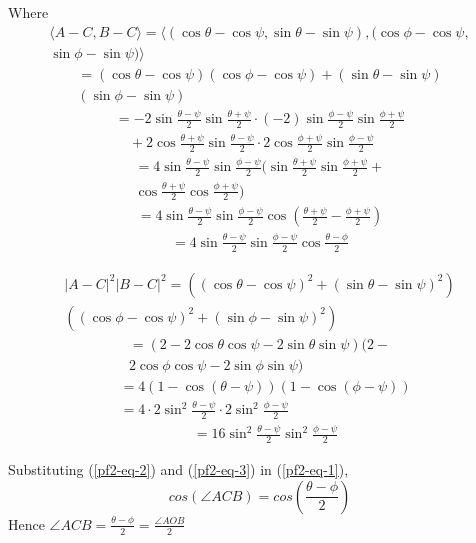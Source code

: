 \documentclass[journal,10pt,twocolumn]{article}
\begin{document}
Where
\begin{multline*}
	\langle A-C, B-C\rangle = \langle (\cos\theta-\cos\psi,\sin\theta-\sin\psi),(\cos\phi-\cos\psi,\\
	\sin\phi-\sin\psi)\rangle
	\end{multline*}
\begin{multline*}
	= (\cos\theta-\cos\psi)(\cos\phi-\cos\psi)+(\sin\theta-\sin\psi)\\
	(\sin\phi-\sin\psi)
\end{multline*}
\begin{multline*}
	= -2\sin\frac{\theta-\psi}2\sin\frac{\theta+\psi}2 \cdot(-2)\sin\frac{\phi-\psi}2\sin\frac{\phi+\psi}2 \\\quad+ 2\cos\frac{\theta+\psi}2\sin\frac{\theta-\psi}2 \cdot 2\cos\frac{\phi+\psi}2\sin\frac{\phi-\psi}2
\end{multline*}
\begin{multline*}
	= 4\sin\frac{\theta-\psi}2\sin\frac{\phi-\psi}2(\sin\frac{\theta+\psi}2\sin\frac{\phi+\psi}2+\\
	\cos\frac{\theta+\psi}2\cos\frac{\phi+\psi}2)
\end{multline*}
\begin{align*}
	= 4\sin\frac{\theta-\psi}2\sin\frac{\phi-\psi}2\cos\left(\frac{\theta+\psi}2-\frac{\phi+\psi}2\right)
\end{align*}
\begin{align}
	= 4\sin\frac{\theta-\psi}2\sin\frac{\phi-\psi}2\cos\frac{\theta-\phi}2
	\label{pf2-eq-2}
\end{align}

\begin{multline*}
	|A-C|^2|B-C|^2 = ((\cos\theta-\cos\psi)^2+(\sin\theta-\sin\psi)^2)\\
	((\cos\phi-\cos\psi)^2+(\sin\phi-\sin\psi)^2)
\end{multline*}
\begin{multline*}
	= (2-2\cos\theta\cos\psi - 2\sin\theta\sin\psi)(2-\\
	2\cos\phi\cos\psi - 2\sin\phi\sin\psi)
\end{multline*}
\begin{align*}
	&= 4(1-\cos(\theta-\psi))(1-\cos(\phi-\psi))\\
	&= 4\cdot 2\sin^2\frac{\theta-\psi}2\cdot 2\sin^2\frac{\phi-\psi}2
\end{align*}
\begin{align}
	&= 16 \sin^2\frac{\theta-\psi}2\sin^2\frac{\phi-\psi}2
	\label{pf2-eq-3}
\end{align}

Substituting (\ref{pf2-eq-2}) and (\ref{pf2-eq-3}) in (\ref{pf2-eq-1}),
\begin{equation}
	cos(\angle ACB) = cos(\frac{\theta-\phi}{2})	
\end{equation}
Hence $\angle ACB = \frac{\theta-\phi}{2} = \frac{\angle AOB}{2}$
\end{document}
